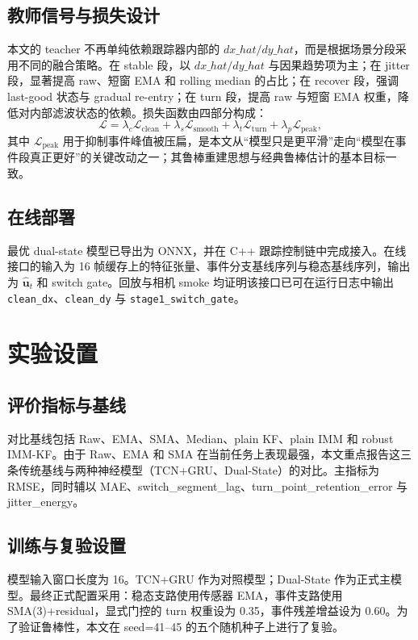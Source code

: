 \documentclass[preprint,12pt]{elsarticle}
\begin{document}
\subsection{教师信号与损失设计}
本文的 teacher 不再单纯依赖跟踪器内部的 $dx\_hat/dy\_hat$，而是根据场景分段采用不同的融合策略。在 stable 段，以 $dx\_hat/dy\_hat$ 与因果趋势项为主；在 jitter 段，显著提高 raw、短窗 EMA 和 rolling median 的占比；在 recover 段，强调 last-good 状态与 gradual re-entry；在 turn 段，提高 raw 与短窗 EMA 权重，降低对内部滤波状态的依赖。损失函数由四部分构成：
\begin{equation}
\mathcal{L}=\lambda_c\mathcal{L}_{\mathrm{clean}}+\lambda_s\mathcal{L}_{\mathrm{smooth}}+\lambda_t\mathcal{L}_{\mathrm{turn}}+\lambda_p\mathcal{L}_{\mathrm{peak}},
\end{equation}
其中 $\mathcal{L}_{\mathrm{peak}}$ 用于抑制事件峰值被压扁，是本文从“模型只是更平滑”走向“模型在事件段真正更好”的关键改动之一；其鲁棒重建思想与经典鲁棒估计的基本目标一致\cite{huber1964robust}。

\subsection{在线部署}
最优 dual-state 模型已导出为 ONNX，并在 C++ 跟踪控制链中完成接入。在线接口的输入为 16 帧缓存上的特征张量、事件分支基线序列与稳态基线序列，输出为 $\hat{\mathbf{u}}_t$ 和 switch gate。回放与相机 smoke 均证明该接口已可在运行日志中输出 \texttt{clean\_dx}、\texttt{clean\_dy} 与 \texttt{stage1\_switch\_gate}。

\section{实验设置}
\subsection{评价指标与基线}
对比基线包括 Raw、EMA、SMA、Median、plain KF、plain IMM 和 robust IMM-KF。由于 Raw、EMA 和 SMA 在当前任务上表现最强，本文重点报告这三条传统基线与两种神经模型（TCN+GRU、Dual-State）的对比。主指标为 RMSE，同时辅以 MAE、switch\_segment\_lag、turn\_point\_retention\_error 与 jitter\_energy。

\subsection{训练与复验设置}
模型输入窗口长度为 16。TCN+GRU 作为对照模型；Dual-State 作为正式主模型。最终正式配置采用：稳态支路使用传感器 EMA，事件支路使用 SMA(3)+residual，显式门控的 turn 权重设为 0.35，事件残差增益设为 0.60。为了验证鲁棒性，本文在 seed=41--45 的五个随机种子上进行了复验。
\end{document}
